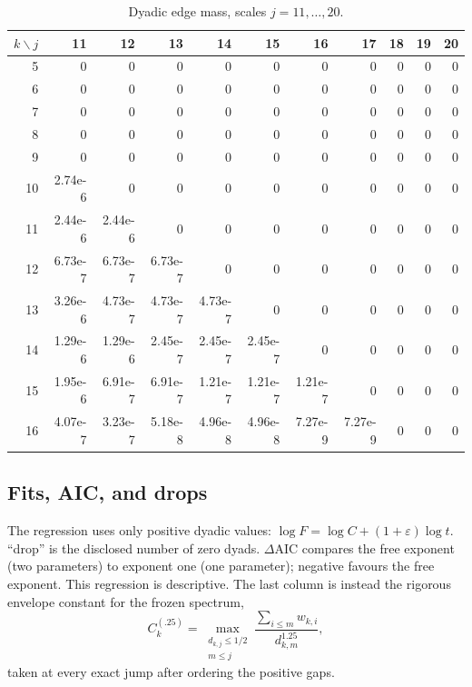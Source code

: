 \documentclass[11pt]{article}
\theoremstyle{remark}
\begin{document}
\begin{table}[ht]
\centering\scriptsize
\caption{Dyadic edge mass, scales $j=11,\ldots,20$.}
\label{tab:f2}
\begin{tabular}{@{}r*{10}{r}@{}}
\toprule
$k\backslash j$&11&12&13&14&15&16&17&18&19&20\\
\midrule
5&0&0&0&0&0&0&0&0&0&0\\
6&0&0&0&0&0&0&0&0&0&0\\
7&0&0&0&0&0&0&0&0&0&0\\
8&0&0&0&0&0&0&0&0&0&0\\
9&0&0&0&0&0&0&0&0&0&0\\
10&2.74e-6&0&0&0&0&0&0&0&0&0\\
11&2.44e-6&2.44e-6&0&0&0&0&0&0&0&0\\
12&6.73e-7&6.73e-7&6.73e-7&0&0&0&0&0&0&0\\
13&3.26e-6&4.73e-7&4.73e-7&4.73e-7&0&0&0&0&0&0\\
14&1.29e-6&1.29e-6&2.45e-7&2.45e-7&2.45e-7&0&0&0&0&0\\
15&1.95e-6&6.91e-7&6.91e-7&1.21e-7&1.21e-7&1.21e-7&0&0&0&0\\
16&4.07e-7&3.23e-7&5.18e-8&4.96e-8&4.96e-8&7.27e-9&7.27e-9&0&0&0\\
\bottomrule
\end{tabular}
\end{table}

\subsection{Fits, AIC, and drops}

The regression uses only positive dyadic values:
$\log F=\log C+(1+\varepsilon)\log t$.  ``drop'' is the disclosed
number of zero dyads.  $\Delta\mathrm{AIC}$ compares the free exponent
(two parameters) to exponent one (one parameter); negative favours the
free exponent.  This regression is descriptive.  The last column is
instead the rigorous envelope constant for the frozen spectrum,
\[
 C_k^{(.25)}=\max_{\substack{d_{k,j}\le1/2\\m\le j}}
 \frac{\sum_{i\le m}w_{k,i}}{d_{k,m}^{1.25}},
\]
taken at every exact jump after ordering the positive gaps.
\end{document}
